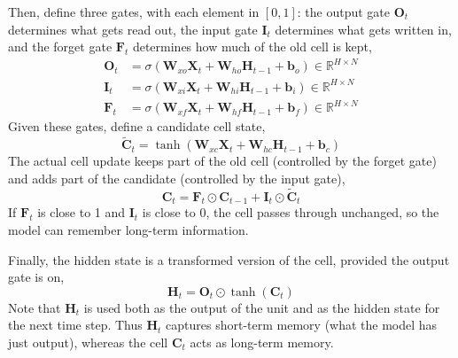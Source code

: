 \documentclass[11pt]{article}
\begin{document}
Then, define three gates, with each element in $[0,1]$: the output gate
$\mathbf{O}_t$ determines what gets read out, the input gate $\mathbf{I}_t$
determines what gets written in, and the forget gate $\mathbf{F}_t$ determines
how much of the old cell is kept,
\[
\begin{aligned}
\mathbf{O}_t &= \sigma(\mathbf{W}_{xo}\mathbf{X}_t + \mathbf{W}_{ho}\mathbf{H}_{t-1} + \boldsymbol{b}_o) \in \mathbb{R}^{H\times N} \\
\mathbf{I}_t &= \sigma(\mathbf{W}_{xi}\mathbf{X}_t + \mathbf{W}_{hi}\mathbf{H}_{t-1} + \boldsymbol{b}_i) \in \mathbb{R}^{H\times N} \\
\mathbf{F}_t &= \sigma(\mathbf{W}_{xf}\mathbf{X}_t + \mathbf{W}_{hf}\mathbf{H}_{t-1} + \boldsymbol{b}_f) \in \mathbb{R}^{H\times N}
\end{aligned}
\]
Given these gates, define a candidate cell state,
\[
\tilde{\mathbf{C}}_t = \tanh(\mathbf{W}_{xc}\mathbf{X}_t + \mathbf{W}_{hc}\mathbf{H}_{t-1} + \boldsymbol{b}_c)
\]
The actual cell update keeps part of the old cell (controlled by the forget
gate) and adds part of the candidate (controlled by the input gate),
\[
\mathbf{C}_t = \mathbf{F}_t \odot \mathbf{C}_{t-1} + \mathbf{I}_t \odot \tilde{\mathbf{C}}_t
\]
If $\mathbf{F}_t$ is close to 1 and $\mathbf{I}_t$ is close to 0, the cell
passes through unchanged, so the model can remember long-term information.

Finally, the hidden state is a transformed version of the cell, provided the
output gate is on,
\[
\mathbf{H}_t = \mathbf{O}_t \odot \tanh(\mathbf{C}_t)
\]
Note that $\mathbf{H}_t$ is used both as the output of the unit and as the hidden state for the next time step. 
Thus $\mathbf{H}_t$ captures short-term memory (what the model has just output), whereas the cell $\mathbf{C}_t$ acts as long-term memory.
\end{document}
